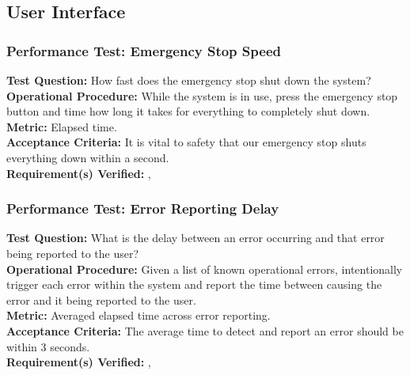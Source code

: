 
\subsection{User Interface}
\label{sec:verification_ui}

\subsubsection{Performance Test: Emergency Stop Speed}
\label{sec:ui_pt_stop_speed}
\textbf{Test Question:} How fast does the emergency stop shut down the system? \\
\textbf{Operational Procedure:} While the system is in use, press the emergency stop button and time how long it takes for everything to completely shut down.\\
\textbf{Metric:} Elapsed time. \\
\textbf{Acceptance Criteria:} It is vital to safety that our emergency stop shuts everything down within a second. \\
\textbf{Requirement(s) Verified:} , 

\subsubsection{Performance Test: Error Reporting Delay}
\label{sec:ui_pt_error_delay}
\textbf{Test Question:} What is the delay between an error occurring and that error being reported to the user? \\
\textbf{Operational Procedure:} Given a list of known operational errors, intentionally trigger each error within the system and report the time between causing the error and it being reported to the user. \\
\textbf{Metric:} Averaged elapsed time across error reporting. \\
\textbf{Acceptance Criteria:} The average time to detect and report an error should be within 3 seconds. \\
\textbf{Requirement(s) Verified:} , 

